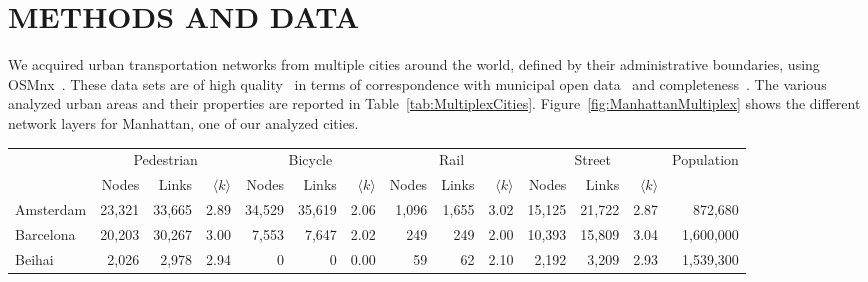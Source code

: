 \section{METHODS AND DATA}
We acquired urban transportation networks from multiple cities around the world, defined by their administrative boundaries, using OSMnx~\cite{Boeing2017OSMNX}. These data sets are of high quality~\cite{Haklay2010OpenStreetMap,Girres2010Quality} in terms of correspondence with municipal open data~\cite{Ferster2019Bicycle} and completeness~\cite{Barbosa-Filho2017Models}. The various analyzed urban areas and their properties are reported in Table~\ref{tab:MultiplexCities}. Figure~\ref{fig:ManhattanMultiplex} shows the different network layers for Manhattan, one  of our analyzed cities.

\begin{table}[ht!]
	\centering
	\begin{adjustbox}{width=\textwidth,keepaspectratio}
		\begin{tabular}{l|rrr|rrr|rrr|rrr|r}
			{}         & \multicolumn{3}{c|}{Pedestrian} & \multicolumn{3}{c|}{Bicycle} & \multicolumn{3}{c|}{Rail} & \multicolumn{3}{c|}{Street} & Population                                                                                                                      \\
			{}         & Nodes                           & Links                        & $\langle k \rangle$       & Nodes                       & Links      & $\langle k \rangle$ & Nodes & Links & $\langle k \rangle$ & Nodes   & Links   & {$\langle k \rangle$}              \\
			\midrule
			Amsterdam  & 23,321                          & 33,665                       & 2.89                      & 34,529                      & 35,619     & 2.06                & 1,096 & 1,655 & 3.02                & 15,125  & 21,722  & 2.87                  & 872,680    \\
			Barcelona  & 20,203                          & 30,267                       & 3.00                      & 7,553                       & 7,647      & 2.02                & 249   & 249   & 2.00                & 10,393  & 15,809  & 3.04                  & 1,600,000  \\
			Beihai     & 2,026                           & 2,978                        & 2.94                      & 0                           & 0          & 0.00                & 59    & 62    & 2.10                & 2,192   & 3,209   & 2.93                  & 1,539,300  \\

\end{tabular}
\end{adjustbox}
\end{table}
